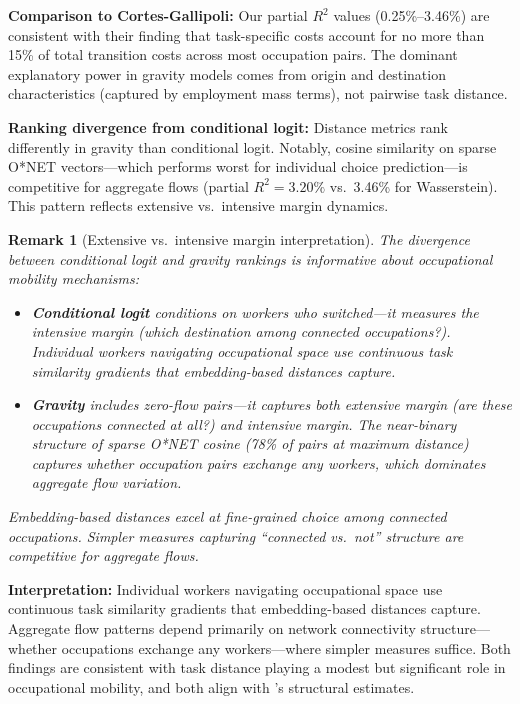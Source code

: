 \documentclass[12pt]{article}
\newtheorem{remark}[definition]{Remark}
\begin{document}
\textbf{Comparison to Cortes-Gallipoli:} Our partial $R^2$ values (0.25\%--3.46\%) are consistent with their finding that task-specific costs account for no more than 15\% of total transition costs across most occupation pairs. The dominant explanatory power in gravity models comes from origin and destination characteristics (captured by employment mass terms), not pairwise task distance.

\textbf{Ranking divergence from conditional logit:} Distance metrics rank differently in gravity than conditional logit. Notably, cosine similarity on sparse O*NET vectors---which performs worst for individual choice prediction---is competitive for aggregate flows (partial $R^2 = 3.20\%$ vs.\ 3.46\% for Wasserstein). This pattern reflects extensive vs.\ intensive margin dynamics.


\begin{remark}[Extensive vs.\ intensive margin interpretation]
\label{rem:extensive-intensive}
The divergence between conditional logit and gravity rankings is informative about occupational mobility mechanisms:
\begin{itemize}
    \item \textbf{Conditional logit} conditions on workers who switched---it measures the intensive margin (which destination among connected occupations?). Individual workers navigating occupational space use continuous task similarity gradients that embedding-based distances capture.
    \item \textbf{Gravity} includes zero-flow pairs---it captures both extensive margin (are these occupations connected at all?) and intensive margin. The near-binary structure of sparse O*NET cosine (78\% of pairs at maximum distance) captures whether occupation pairs exchange any workers, which dominates aggregate flow variation.
\end{itemize}
Embedding-based distances excel at fine-grained choice among connected occupations. Simpler measures capturing ``connected vs.\ not'' structure are competitive for aggregate flows.
\end{remark}


\textbf{Interpretation:} Individual workers navigating occupational space use continuous task similarity gradients that embedding-based distances capture. Aggregate flow patterns depend primarily on network connectivity structure---whether occupations exchange any workers---where simpler measures suffice. Both findings are consistent with task distance playing a modest but significant role in occupational mobility, and both align with \citet{CortesGallipoli2018}'s structural estimates.
\end{document}
